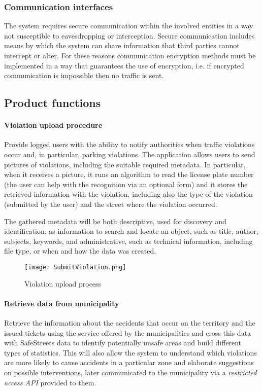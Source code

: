 \subsubsection{Communication interfaces}
	The system requires secure communication within the involved entities in a way not susceptible to eavesdropping or interception. Secure communication includes means by which the system can share information that third parties cannot intercept or alter. For these reasons communication encryption methods must be implemented in a way that guarantees the use of encryption, i.e. if encrypted communication is impossible then no traffic is sent.

\subsection{Product functions}
\paragraph{Violation upload procedure} 
Provide logged users with the ability to notify authorities when traffic violations occur and, in particular, parking violations. The application allows users to send pictures of violations, including the suitable required metadata. In particular, when it receives a picture, it runs an algorithm to read the license plate number (the user can help with the recognition via an optional form) and it stores the retrieved information with the violation, including also the type of the violation (submitted by the user) and the street where the violation occurred.

The gathered metadata will be both descriptive, used for discovery and identification, as information to search and locate an object, such as title, author, subjects, keywords, and administrative, such as technical information, including file type, or when and how the data was created.
\clearpage

	\begin{figure}[h]
		\centering
		\texttt{[image: SubmitViolation.png]}
		\caption{
			\label{fig:violationUpload} Violation upload process
		}
	\end{figure}
	
\paragraph{Retrieve data from municipality}
Retrieve the information about the accidents that occur on the territory and the issued tickets using the service offered by the municipalities and cross this data with SafeStreets data to identify potentially unsafe areas and build different types of statistics. This will also allow the system to understand which violations are more likely to cause accidents in a particular zone and elaborate suggestions on possible interventions, later communicated to the municipality via a \emph{restricted access API} provided to them. \newline

